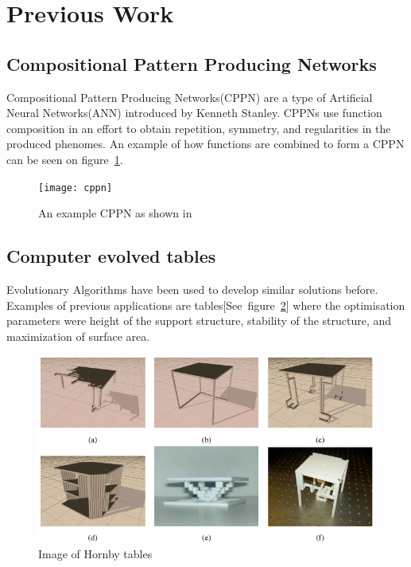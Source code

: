 \section{Previous Work}

\subsection{Compositional Pattern Producing Networks}
\label{sec:cppn}
Compositional Pattern Producing Networks(CPPN) are a type of Artificial Neural Networks(ANN) introduced by Kenneth Stanley\cite{Stanley2007}.
CPPNs use function composition in an effort to obtain repetition, symmetry, and regularities in the produced phenomes.
An example of how functions are combined to form a CPPN can be seen on figure~\ref{fig:cppn}.
\begin{figure}[ht]
\centering
\texttt{[image: cppn]}
\caption{An example CPPN as shown in \cite{Stanley2007}}
\label{fig:cppn}
\end{figure}

\subsection{Computer evolved tables}
Evolutionary Algorithms have been used to develop similar solutions before. Examples of previous  applications are tables[See~figure~\ref{fig:hornby_tables}] where the optimisation parameters were height of the support structure, stability of the structure, and maximization of surface area.
\begin{figure}[ht]
\includegraphics[scale=.6]{content/img/tables}
\caption{Image of Hornby tables\cite{paper:ev4}}
\label{fig:hornby_tables}
\end{figure}

